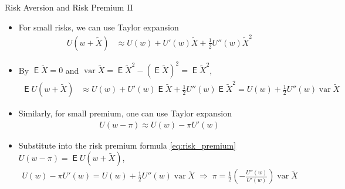 \documentclass[10pt]{beamer}
\DeclareMathOperator\expc{\mathsf{E}}
\DeclareMathOperator\var{var}
\newcommand{\ie}{\;\Longrightarrow\;}
\begin{document}
\begin{frame}{Risk Aversion and Risk Premium II}
  \begin{itemize}[<+->]
    \item For small risks, we can use Taylor expansion 
      \begin{align*}
        U(w + \widetilde{X}) &\approx U(w) + U'(w)\widetilde{X} + \frac{1}{2}U''(w)\widetilde{X}^2
      \end{align*}
    \item By $\expc{\widetilde{X}} = 0$ and $\var{\widetilde{X}} = \expc{\widetilde{X}^2} - (\expc{\widetilde{X}})^2 = \expc{\widetilde{X}^2}$, 
      \begin{align*}
        \expc{U(w + \widetilde{X})} &\approx U(w) + U'(w)\expc{\widetilde{X}} + \frac{1}{2}U''(w)\expc{\widetilde{X}^2} = U(w) + \frac{1}{2}U''(w)\var{\widetilde{X}}
      \end{align*}
    \item Similarly, for small premium, one can use Taylor expansion 
      \begin{align*}
        U(w - \pi) \approx U(w) - \pi U'(w)
      \end{align*}
    \item Substitute into the risk premium formula \eqref{eq:risk_premium} $U(w - \pi) = \expc{U(w + \widetilde{X})}$,
      \begin{align*}
        U(w) - \pi U'(w) = U(w) + \frac{1}{2}U''(w)\var{\widetilde{X}} \ie \pi = \frac{1}{2}\left(-\frac{U''(w)}{U'(w)}\right)\var{\widetilde{X}}
      \end{align*}
  \end{itemize}
\end{frame}
\end{document}
